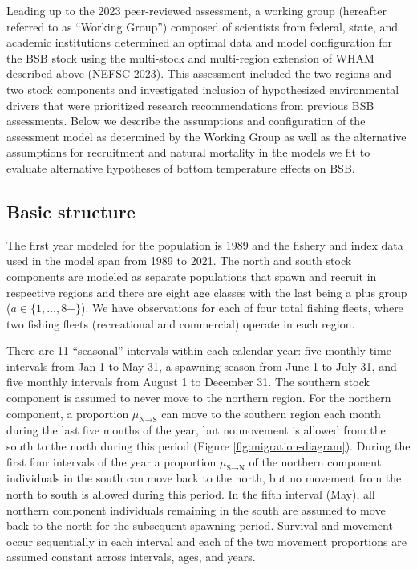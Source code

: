 \documentclass[
]{article}
\begin{document}
Leading up to the 2023 peer-reviewed assessment, a working group (hereafter referred to as ``Working Group'') composed of scientists from federal, state, and academic institutions determined an optimal data and model configuration for the BSB stock using the multi-stock and multi-region extension of WHAM described above (NEFSC 2023). This assessment included the two regions and two stock components and investigated inclusion of hypothesized environmental drivers that were prioritized research recommendations from previous BSB assessments. Below we describe the assumptions and configuration of the assessment model as determined by the Working Group as well as the alternative assumptions for recruitment and natural mortality in the models we fit to evaluate alternative hypotheses of bottom temperature effects on BSB.

\hypertarget{basic-structure}{%
\subsection*{Basic structure}\label{basic-structure}}

The first year modeled for the population is 1989 and the fishery and index data used in the model span from 1989 to 2021. The north and south stock components are modeled as separate populations that spawn and recruit in respective regions and there are eight age classes with the last being a plus group (\(a \in \{1,\ldots,8+\}\)). We have observations for each of four total fishing fleets, where two fishing fleets (recreational and commercial) operate in each region.

There are 11 ``seasonal'' intervals within each calendar year: five monthly time intervals from Jan 1 to May 31, a spawning season from June 1 to July 31, and five monthly intervals from August 1 to December 31. The southern stock component is assumed to never move to the northern region. For the northern component, a proportion \(\mu_{\text{N}\rightarrow \text{S}}\) can move to the southern region each month during the last five months of the year, but no movement is allowed from the south to the north during this period (Figure \ref{fig:migration-diagram}). During the first four intervals of the year a proportion \(\mu_{\text{S}\rightarrow \text{N}}\) of the northern component individuals in the south can move back to the north, but no movement from the north to south is allowed during this period. In the fifth interval (May), all northern component individuals remaining in the south are assumed to move back to the north for the subsequent spawning period. Survival and movement occur sequentially in each interval and each of the two movement proportions are assumed constant across intervals, ages, and years.
\end{document}
